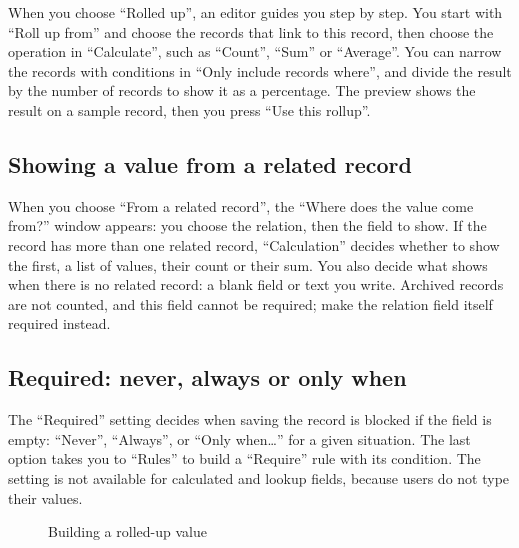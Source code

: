 When you choose “Rolled up”, an editor guides you step by step. You start with “Roll up from” and choose the records that link to this record, then choose the operation in “Calculate”, such as “Count”, “Sum” or “Average”. You can narrow the records with conditions in “Only include records where”, and divide the result by the number of records to show it as a percentage. The preview shows the result on a sample record, then you press “Use this rollup”.

\subsection{Showing a value from a related record}

When you choose “From a related record”, the “Where does the value come from?” window appears: you choose the relation, then the field to show. If the record has more than one related record, “Calculation” decides whether to show the first, a list of values, their count or their sum. You also decide what shows when there is no related record: a blank field or text you write. Archived records are not counted, and this field cannot be required; make the relation field itself required instead.

\subsection{Required: never, always or only when}

The “Required” setting decides when saving the record is blocked if the field is empty: “Never”, “Always”, or “Only when…” for a given situation. The last option takes you to “Rules” to build a “Require” rule with its condition. The setting is not available for calculated and lookup fields, because users do not type their values.

\begin{figure}[H]
\centering
{}
\rclegend
\caption{Building a rolled-up value}
\label{fig:builder-field-values-flow}
\end{figure}

